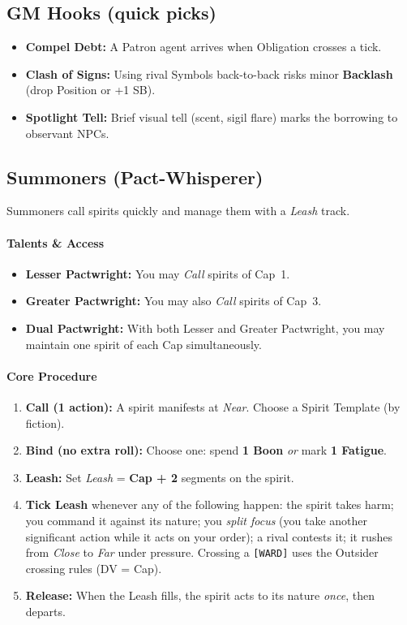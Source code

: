 \subsection*{GM Hooks (quick picks)}
\begin{itemize}
  \item \textbf{Compel Debt:} A Patron agent arrives when Obligation crosses a tick.
  \item \textbf{Clash of Signs:} Using rival Symbols back-to-back risks minor \textbf{Backlash} (drop Position or +1 SB).
  \item \textbf{Spotlight Tell:} Brief visual tell (scent, sigil flare) marks the borrowing to observant NPCs.
\end{itemize}

\subsection{Summoners (Pact-Whisperer)}
\label{subsec:summoners}

Summoners call spirits quickly and manage them with a \emph{Leash} track.

\paragraph{Talents \& Access}
\begin{itemize}
  \item \textbf{Lesser Pactwright:} You may \emph{Call} spirits of Cap~1.
  \item \textbf{Greater Pactwright:} You may also \emph{Call} spirits of Cap~3.
  \item \textbf{Dual Pactwright:} With both Lesser and Greater Pactwright, you may maintain one spirit of each Cap simultaneously.
\end{itemize}

\paragraph{Core Procedure}
\begin{enumerate}
  \item \textbf{Call (1 action):} A spirit manifests at \textit{Near}. Choose a Spirit Template (by fiction).
  \item \textbf{Bind (no extra roll):} Choose one: spend \textbf{1 Boon} \emph{or} mark \textbf{1 Fatigue}.
  \item \textbf{Leash:} Set \textit{Leash} = \textbf{Cap + 2} segments on the spirit.
  \item \textbf{Tick Leash} whenever any of the following happen: the spirit takes harm; you command it against its nature; you \emph{split focus} (you take another significant action while it acts on your order); a rival contests it; it rushes from \textit{Close} to \textit{Far} under pressure. Crossing a \texttt{[WARD]} uses the Outsider crossing rules (DV = Cap).
  \item \textbf{Release:} When the Leash fills, the spirit acts to its nature \emph{once}, then departs.
\end{enumerate}

